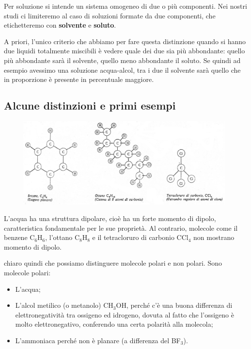 Per soluzione si intende un sistema omogeneo di due o più componenti. Nei nostri studi ci limiteremo al caso di soluzioni formate da due componenti, che etichetteremo con \textbf{solvente} e \textbf{soluto}.

A priori, l'unico criterio che abbiamo per fare questa distinzione quando si hanno due liquidi totalmente miscibili è vedere quale dei due sia più abbondante: quello più abbondante sarà il solvente, quello meno abbondante il soluto. Se quindi ad esempio avessimo una soluzione acqua-alcol, tra i due il solvente sarà quello che in proporzione è presente in percentuale maggiore.

\subsection{Alcune distinzioni e primi esempi}

\begin{figure}[htp]
    \centering
    \includegraphics[width=11cm]{immagini/molecole_non_polari.png}
\end{figure}

L'acqua ha una struttura dipolare, cioè ha un forte momento di dipolo, caratteristica fondamentale per le sue proprietà. Al contrario, molecole come il benzene C$_6$H$_6$, l'ottano C$_8$H$_8$ e il tetracloruro di carbonio CCl$_4$ non mostrano momento di dipolo.

\E chiaro quindi che possiamo distinguere molecole polari e non polari. Sono molecole polari:

\begin{itemize}
    \item L'acqua;
    \item L'alcol metilico (o metanolo) CH$_3$OH, perché c'è una buona differenza di elettronegatività tra ossigeno ed idrogeno, dovuta al fatto che l'ossigeno è molto elettronegativo, conferendo una certa polarità alla molecola;
    \item L'ammoniaca perché non è planare (a differenza del BF$_3$).
\end{itemize}

